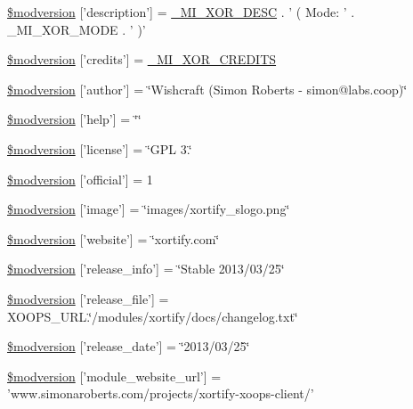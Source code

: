 \begin{DoxyCompactItemize}
\item 
\hyperlink{xoops__version_8php_a3e2ba4037e62f8dd1790bdbde525315a}{\$modversion} \mbox{[}'description'\mbox{]} = \hyperlink{modinfo_8php_ad67726f7fdc3379977791dbae46e7a2e}{\-\_\-\-M\-I\-\_\-\-X\-O\-R\-\_\-\-D\-E\-S\-C} . ' ( Mode\-: ' . \-\_\-\-M\-I\-\_\-\-X\-O\-R\-\_\-\-M\-O\-D\-E . ' )'
\item 
\hyperlink{xoops__version_8php_a959303c9b36209d115fdef00ee85b476}{\$modversion} \mbox{[}'credits'\mbox{]} = \hyperlink{modinfo_8php_abed4f2d9574815f82f828253c69b3045}{\-\_\-\-M\-I\-\_\-\-X\-O\-R\-\_\-\-C\-R\-E\-D\-I\-T\-S}
\item 
\hyperlink{xoops__version_8php_a71cc638deee036400821a7fbe821c9c0}{\$modversion} \mbox{[}'author'\mbox{]} = \char`\"{}Wishcraft (Simon Roberts -\/ simon@labs.\-coop)\char`\"{}
\item 
\hyperlink{xoops__version_8php_ab024cf3ad0ca97d54e30a29c04a00d21}{\$modversion} \mbox{[}'help'\mbox{]} = \char`\"{}\char`\"{}
\item 
\hyperlink{xoops__version_8php_ac01b0a110a2b2471b022408cc144ba6a}{\$modversion} \mbox{[}'license'\mbox{]} = \char`\"{}G\-P\-L 3.\char`\"{}
\item 
\hyperlink{xoops__version_8php_a67cc0580683a24bde7fb2a93a6b0b8b3}{\$modversion} \mbox{[}'official'\mbox{]} = 1
\item 
\hyperlink{xoops__version_8php_a2372fb2a0d0c8276a91ee60be1ba845b}{\$modversion} \mbox{[}'image'\mbox{]} = \char`\"{}images/xortify\-\_\-slogo.\-png\char`\"{}
\item 
\hyperlink{xoops__version_8php_a71a5da9d3a0c17c57f174d20d27f3be3}{\$modversion} \mbox{[}'website'\mbox{]} = \char`\"{}xortify.\-com\char`\"{}
\item 
\hyperlink{xoops__version_8php_a123c91e534177f17f2f74d6f0608ba7a}{\$modversion} \mbox{[}'release\-\_\-info'\mbox{]} = \char`\"{}Stable 2013/03/25\char`\"{}
\item 
\hyperlink{xoops__version_8php_ad5a8e1dbbf9b0a009bf8cf4479d02278}{\$modversion} \mbox{[}'release\-\_\-file'\mbox{]} = X\-O\-O\-P\-S\-\_\-\-U\-R\-L.\char`\"{}/modules/xortify/docs/changelog.\-txt\char`\"{}
\item 
\hyperlink{xoops__version_8php_acb3338b35e8702eeb9add71947190f39}{\$modversion} \mbox{[}'release\-\_\-date'\mbox{]} = \char`\"{}2013/03/25\char`\"{}
\item 
\hyperlink{xoops__version_8php_a563f37b735830ef4c581ad9e434be79d}{\$modversion} \mbox{[}'module\-\_\-website\-\_\-url'\mbox{]} = 'www.\-simonaroberts.\-com/projects/xortify-\/xoops-\/client/'

\end{DoxyCompactItemize}
